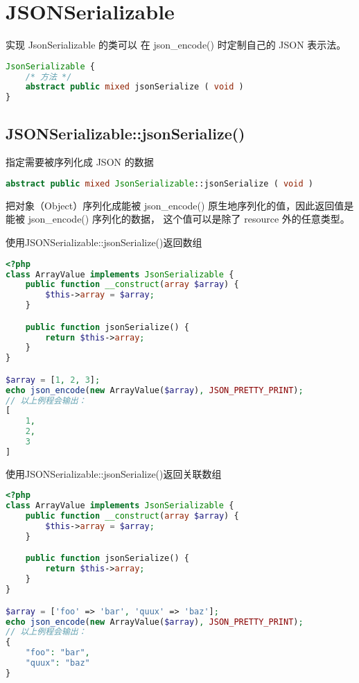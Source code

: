 \chapter{JSONSerializable}


实现 JsonSerializable 的类可以 在 json\_encode() 时定制自己的 JSON 表示法。

\begin{lstlisting}[language=PHP]
JsonSerializable {
    /* 方法 */
    abstract public mixed jsonSerialize ( void )
}
\end{lstlisting}

\section{JSONSerializable::jsonSerialize()}

指定需要被序列化成 JSON 的数据


\begin{lstlisting}[language=PHP]
abstract public mixed JsonSerializable::jsonSerialize ( void )
\end{lstlisting}

把对象（Object）序列化成能被 json\_encode() 原生地序列化的值，因此返回值是能被 json\_encode() 序列化的数据， 这个值可以是除了 resource 外的任意类型。

\begin{example}
使用JSONSerializable::jsonSerialize()返回数组
\begin{lstlisting}[language=PHP]
<?php
class ArrayValue implements JsonSerializable {
    public function __construct(array $array) {
        $this->array = $array;
    }

    public function jsonSerialize() {
        return $this->array;
    }
}

$array = [1, 2, 3];
echo json_encode(new ArrayValue($array), JSON_PRETTY_PRINT);
// 以上例程会输出：
[
    1,
    2,
    3
]
\end{lstlisting}
\end{example}


\begin{example}
使用JSONSerializable::jsonSerialize()返回关联数组
\begin{lstlisting}[language=PHP]
<?php
class ArrayValue implements JsonSerializable {
    public function __construct(array $array) {
        $this->array = $array;
    }

    public function jsonSerialize() {
        return $this->array;
    }
}

$array = ['foo' => 'bar', 'quux' => 'baz'];
echo json_encode(new ArrayValue($array), JSON_PRETTY_PRINT);
// 以上例程会输出：
{
    "foo": "bar",
    "quux": "baz"
}
\end{lstlisting}
\end{example}


